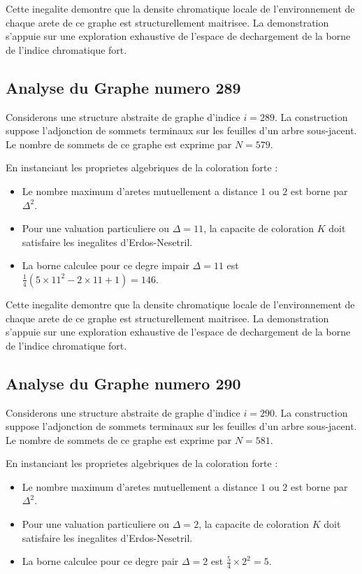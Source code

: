 \documentclass[11pt,a4paper]{article}
\begin{document}
Cette inegalite demontre que la densite chromatique locale de l'environnement de chaque arete de ce graphe est structurellement maitrisee. La demonstration s'appuie sur une exploration exhaustive de l'espace de dechargement de la borne de l'indice chromatique fort.

\subsection{Analyse du Graphe numero 289}
Considerons une structure abstraite de graphe d'indice $i = 289$. La construction suppose l'adjonction de sommets terminaux sur les feuilles d'un arbre sous-jacent. Le nombre de sommets de ce graphe est exprime par $N = 579$.

En instanciant les proprietes algebriques de la coloration forte :
\begin{itemize}
\item Le nombre maximum d'aretes mutuellement a distance $1$ ou $2$ est borne par $\Delta^2$.
\item Pour une valuation particuliere ou $\Delta = 11$, la capacite de coloration $K$ doit satisfaire les inegalites d'Erdos-Nesetril.
\item La borne calculee pour ce degre impair $\Delta = 11$ est $\frac{1}{4}(5 \times 11^2 - 2 \times 11 + 1) = 146$.
\end{itemize}

Cette inegalite demontre que la densite chromatique locale de l'environnement de chaque arete de ce graphe est structurellement maitrisee. La demonstration s'appuie sur une exploration exhaustive de l'espace de dechargement de la borne de l'indice chromatique fort.

\subsection{Analyse du Graphe numero 290}
Considerons une structure abstraite de graphe d'indice $i = 290$. La construction suppose l'adjonction de sommets terminaux sur les feuilles d'un arbre sous-jacent. Le nombre de sommets de ce graphe est exprime par $N = 581$.

En instanciant les proprietes algebriques de la coloration forte :
\begin{itemize}
\item Le nombre maximum d'aretes mutuellement a distance $1$ ou $2$ est borne par $\Delta^2$.
\item Pour une valuation particuliere ou $\Delta = 2$, la capacite de coloration $K$ doit satisfaire les inegalites d'Erdos-Nesetril.
\item La borne calculee pour ce degre pair $\Delta = 2$ est $\frac{5}{4} \times 2^2 = 5$.
\end{itemize}
\end{document}
